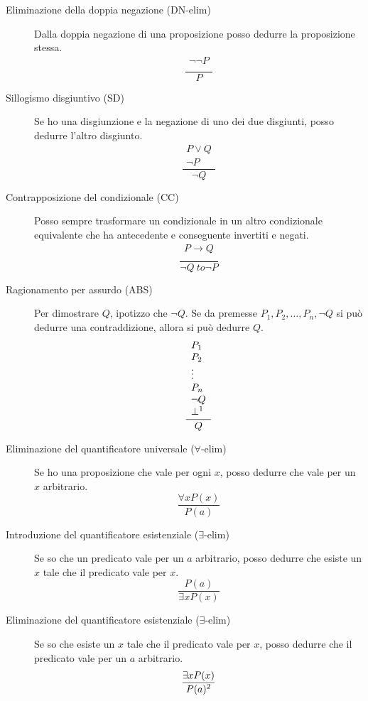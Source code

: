 \documentclass[12pt]{article}
\begin{document}
\begin{description}
        \item[Eliminazione della doppia negazione (DN-elim)]
        Dalla doppia negazione di una proposizione posso dedurre la proposizione stessa.
        \[
        \dfrac{
        \begin{array}{l}
        \neg \neg P\\
        \end{array}
        }{P}
        \]

        \item[Sillogismo disgiuntivo (SD)]
        Se ho una disgiunzione e la negazione di uno dei due disgiunti, posso dedurre l'altro disgiunto.
        \[
        \dfrac{
        \begin{array}{l}
        P\lor Q\\
        \neg P
        \end{array}
        }{\neg Q}
        \]

        \item[Contrapposizione del condizionale (CC)]
        Posso sempre trasformare un condizionale in un altro condizionale equivalente che ha antecedente e conseguente invertiti e negati.
        \[
        \dfrac{
        \begin{array}{l}
        P\to Q\\
        \end{array}
        }{\neg Q \ to \neg P}
        \]

        \item[Ragionamento per assurdo (ABS)]
        Per dimostrare $Q$, ipotizzo che $\neg Q$. Se da premesse $P_1, P_2, \ldots, P_n, \neg Q$ si può dedurre una contraddizione, allora si può dedurre $Q$.
        \[
        \dfrac{
        \begin{array}{l}
        P_1\\
        P_2\\
        \vdots\\
        P_n\\
        \neg Q\\
        \bot\footnotemark
        \end{array}
        }{Q}
        \]

        \item[Eliminazione del quantificatore universale ($\forall$-elim)]
        Se ho una proposizione che vale per ogni $x$, posso dedurre che vale per un $x$ arbitrario.
        \[
        \dfrac{
        \forall x P(x)
            }
            {P(a)}
        \]
        \item[Introduzione del quantificatore esistenziale ($\exists$-elim)]
        Se so che un predicato vale per un $a$ arbitrario, posso dedurre che esiste un $x$ tale che il predicato vale per $x$.
        \[
        \dfrac{
        P(a)
            }
            {\exists x P(x)}
        \]
        \item[Eliminazione del quantificatore esistenziale ($\exists$-elim)]
        Se so che esiste un $x$ tale che il predicato vale per $x$, posso dedurre che il predicato vale per un $a$ arbitrario.
        \[
        \dfrac{
        \exists x P(x)
            }
            {P(a)\footnotemark}
        \]

    \end{description}
\end{document}
